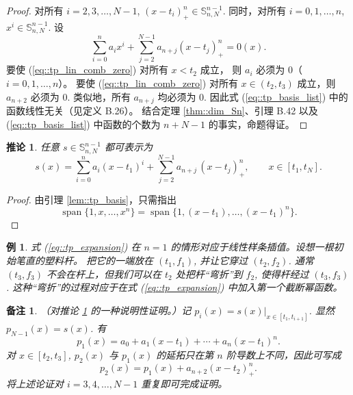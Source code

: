 \documentclass[a4paper]{ctexart}
\newtheorem{remark}{备注}
\newtheorem{corollary}[theorem]{推论}
\newtheorem{example}[theorem]{例}
\numberwithin{theorem}{section}
\numberwithin{equation}{section}
\numberwithin{figure}{section}
\numberwithin{remark}{section}
\begin{document}
\begin{proof}
对所有 $i=2,3,\ldots,N-1$, $(x-t_i)_{+}^{n}\in \mathbb{S}^{n-1}_{n,N}$.
同时，对所有 $i=0,1,\ldots,n$, $x^{i}\in \mathbb{S}^{n-1}_{n,N}$. 设
\begin{equation}
\label{eq::tp_lin_comb_zero}
\sum_{i=0}^{n} a_i x^{i} + \sum_{j=2}^{N-1} a_{n+j}(x-t_j)_{+}^{n}=0(x).
\end{equation}
要使 (\ref{eq::tp_lin_comb_zero}) 对所有 $x<t_2$ 成立，
则 $a_i$ 必须为 0（$i=0,1,\ldots,n$）。
要使 (\ref{eq::tp_lin_comb_zero}) 对所有 $x\in(t_2,t_3)$ 
成立，则 $a_{n+2}$ 必须为 $0$. 类似地，所有 $a_{n+j}$ 均必须为 $0$. 因此式 (\ref{eq::tp_basis_list}) 中的函数线性无关（见定义 B.26）。
结合定理 \ref{thm::dim_Sn}、引理 B.42 以及 (\ref{eq::tp_basis_list}) 中函数的个数为 $n+N-1$ 的事实，命题得证。
\end{proof}

\begin{corollary}
    \label{cor::tp_expansion}
任意 $s\in \mathbb{S}^{n-1}_{n,N}$ 都可表示为
\begin{equation}
\label{eq::tp_expansion}
s(x)=\sum_{i=0}^{n} a_i (x-t_1)^{i}
+\sum_{j=2}^{N-1} a_{n+j}\,(x-t_j)_{+}^{n},
\qquad x\in[t_1,t_N].
\end{equation}
\end{corollary}

\begin{proof}
由引理 \ref{lem::tp_basis}，只需指出
\[
\operatorname{span}\{1,x,\ldots,x^{n}\}
=\operatorname{span}\{1,(x-t_1),\ldots,(x-t_1)^{n}\}.
\]
\end{proof}

\begin{example}
    \label{ex::n1_linear_interp}
式 (\ref{eq::tp_expansion}) 在 $n=1$ 的情形对应于线性样条插值。设想一根初始笔直的塑料杆。
把它的一端放在 $(t_1,f_1)$, 并让它穿过 $(t_2,f_2)$. 通常 $(t_3,f_3)$ 不会在杆上，但我们可以在 $t_2$ 处把杆“弯折”到 $f_2$, 
使得杆经过 $(t_3,f_3)$. 这种“弯折”的过程对应于在式 (\ref{eq::tp_expansion}) 中加入第一个截断幂函数。
\end{example}

\begin{remark}
    \label{rem::proof_cor_tp}
（对推论 \ref{cor::tp_expansion} 的一种说明性证明。）记
$p_i(x)=s(x)\big|_{x\in[t_1,t_{i+1}]}$. 显然 $p_{N-1}(x)=s(x)$. 有
\[
p_1(x)=a_0+a_1(x-t_1)+\cdots+a_n(x-t_1)^n.
\]
对 $x\in[t_2,t_3]$, $p_2(x)$ 与 $p_1(x)$ 的延拓只在第 $n$ 阶导数上不同，因此可写成
\[
p_2(x)=p_1(x)+a_{n+2}(x-t_2)_{+}^{n}.
\]
将上述论证对 $i=3,4,\ldots,N-1$ 重复即可完成证明。
\end{remark}
\end{document}
